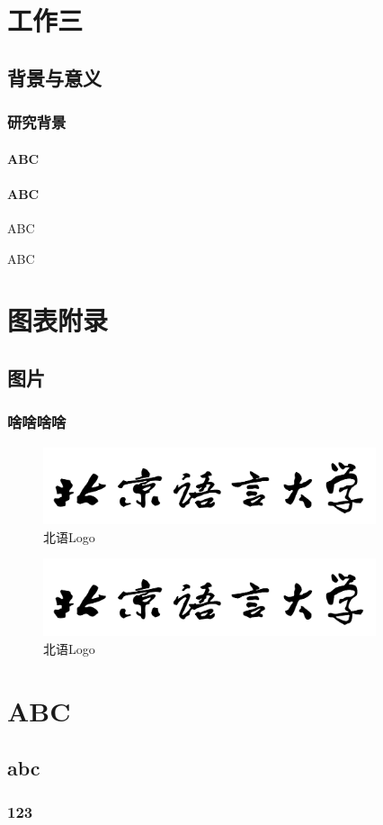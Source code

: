\documentclass[doctor,final,twoside]{blcuthesis}
\begin{document}
\chapter{工作三}
\section{背景与意义}
\subsection{研究背景}
\subsubsection{ABC}
\subsubsection{ABC}
ABC\citet{Xiang:20}

ABC\citep{Xiang:20}

\nocite{*}



\appendix

\chapter{图表附录}
\section{图片}
\subsection{啥啥啥啥}
\begin{figure}[h]
	\centering
	\includegraphics[width=9.8cm]{figures/BLCULogoText.png}
	\caption{北语Logo}
\end{figure}

\begin{figure}[h]
	\centering
	\includegraphics[width=9.8cm]{figures/BLCULogoText.png}
	\caption{北语Logo}
\end{figure}
\listoffigures

\chapter{ABC}
\section{abc}
\subsection{123}
\end{document}
